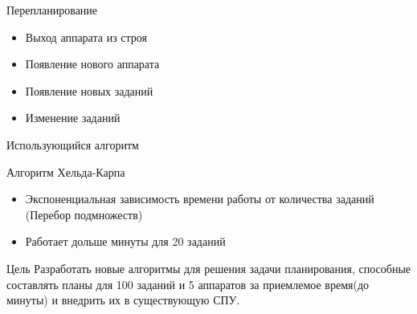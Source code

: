 \documentclass{beamer}
\begin{document}
\begin{frame}{Перепланирование}
\begin{itemize}
\item Выход аппарата из строя
\item Появление нового аппарата
\item Появление новых заданий
\item Изменение заданий
\end{itemize}
\end{frame}

\begin{frame}{Использующийся алгоритм}

Алгоритм Хельда-Карпа
\begin{itemize}
\item Экспоненциальная зависимость времени работы от количества заданий (Перебор подмножеств)
\item Работает дольше минуты для 20 заданий
\end{itemize}

\begin{block}{Цель}
Разработать новые алгоритмы для решения задачи планирования, способные составлять планы для 100 заданий и 5 аппаратов за приемлемое время(до минуты) и внедрить их в существующую СПУ.
\end{block}

\end{frame}
\end{document}
